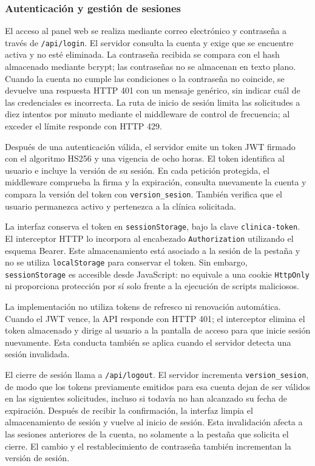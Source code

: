 
\subsubsection{Autenticación y gestión de sesiones}

El acceso al panel web se realiza mediante correo electrónico y contraseña
a través de \texttt{/api/login}. El servidor consulta la cuenta y exige que
se encuentre activa y no esté eliminada. La contraseña recibida se compara
con el hash almacenado mediante bcrypt; las contraseñas no se almacenan en
texto plano. Cuando la cuenta no cumple las condiciones o la contraseña no
coincide, se devuelve una respuesta HTTP 401 con un mensaje genérico, sin
indicar cuál de las credenciales es incorrecta. La ruta de inicio de sesión
limita las solicitudes a diez intentos por minuto mediante el middleware
de control de frecuencia; al exceder el límite responde con HTTP 429.

Después de una autenticación válida, el servidor emite un token JWT firmado
con el algoritmo HS256 y una vigencia de ocho horas. El token identifica al
usuario e incluye la versión de su sesión. En cada petición protegida, el
middleware comprueba la firma y la expiración, consulta nuevamente la cuenta
y compara la versión del token con \texttt{version\_sesion}. También verifica
que el usuario permanezca activo y pertenezca a la clínica solicitada.

La interfaz conserva el token en \texttt{sessionStorage}, bajo la clave
\texttt{clinica-token}. El interceptor HTTP lo incorpora al encabezado
\texttt{Authorization} utilizando el esquema Bearer. Este almacenamiento
está asociado a la sesión de la pestaña y no se utiliza
\texttt{localStorage} para conservar el token. Sin embargo,
\texttt{sessionStorage} es accesible desde JavaScript: no equivale a una
cookie \texttt{HttpOnly} ni proporciona protección por sí solo frente a
la ejecución de scripts maliciosos.

La implementación no utiliza tokens de refresco ni renovación automática.
Cuando el JWT vence, la API responde con HTTP 401; el interceptor elimina
el token almacenado y dirige al usuario a la pantalla de acceso para que
inicie sesión nuevamente. Esta conducta también se aplica cuando el
servidor detecta una sesión invalidada.

El cierre de sesión llama a \texttt{/api/logout}. El servidor incrementa
\texttt{version\_sesion}, de modo que los tokens previamente emitidos para
esa cuenta dejan de ser válidos en las siguientes solicitudes, incluso
si todavía no han alcanzado su fecha de expiración. Después de recibir la
confirmación, la interfaz limpia el almacenamiento de sesión y vuelve al
inicio de sesión. Esta invalidación afecta a las sesiones anteriores de
la cuenta, no solamente a la pestaña que solicita el cierre. El cambio y
el restablecimiento de contraseña también incrementan la versión de sesión.

